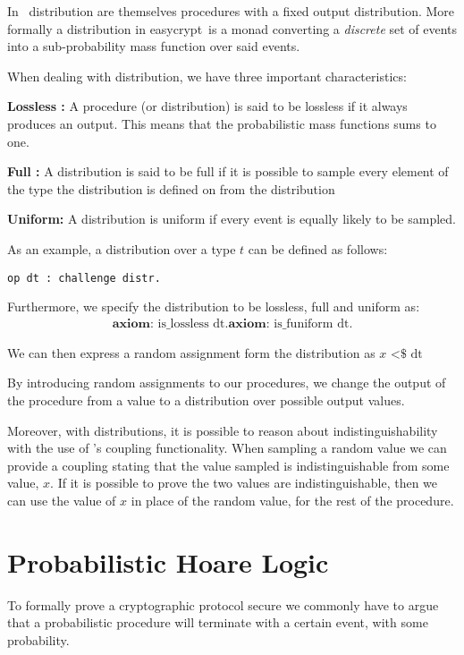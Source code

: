 In \easycrypt\ distribution are themselves procedures with a fixed output
distribution. More formally a distribution in easycrypt\ is a monad converting a
\textit{discrete} set of events into a sub-probability mass function over said events.

When dealing with distribution, we have three important characteristics:

\noindent \textbf{Lossless :} A procedure (or distribution) is said to be
lossless if it always produces an output. This means that the
probabilistic mass functions sums to one.

\noindent \textbf{Full :} A distribution is said to be full if it is
possible to sample every element of the type the distribution is defined on from
the distribution

\noindent \textbf{Uniform: } A distribution is uniform if every event is equally
likely to be sampled.

As an example, a distribution over a type $t$ can be defined as follows:
\begin{lstlisting}[frame=none]
op dt : challenge distr.
\end{lstlisting}
Furthermore, we specify the distribution to be lossless, full and uniform as:
\begin{gather*}
  \textbf{axiom: } \text{is\_lossless dt}.
  \textbf{axiom: } \text{is\_funiform dt}.
\end{gather*}

We can then express a random assignment form the distribution as $x \text{ <\$} \text{ dt}$


By introducing random assignments to our procedures, we change
the output of the procedure from a value to a distribution over possible output values.

Moreover, with distributions, it is possible to reason about indistinguishability
with the use of \easycrypt's coupling functionality. When sampling a random
value we can provide a coupling stating that the value sampled is
indistinguishable from some value, $x$. If it is possible to prove the two
values are indistinguishable, then we can use the value of $x$ in place of the
random value, for the rest of the procedure.


\section{Probabilistic Hoare Logic}
\label{sec:pHL}
To formally prove a cryptographic protocol secure we commonly have to argue
that a probabilistic procedure will terminate with a certain event,
with some probability.

